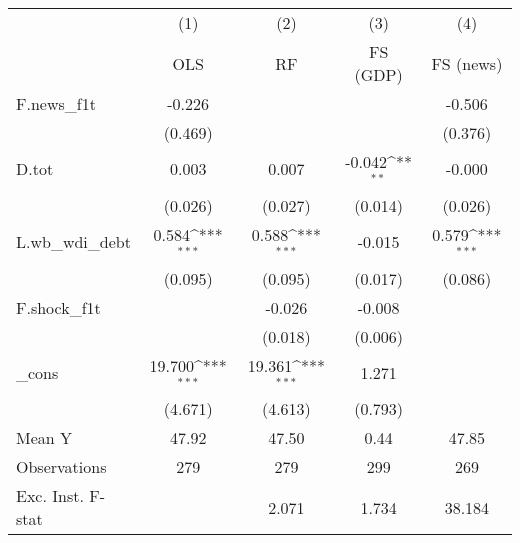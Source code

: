 {
\def\sym#1{\ifmmode^{#1}\else\(^{#1}\)\fi}
\begin{tabular}{l*{4}{c}}
\toprule
            &\multicolumn{1}{c}{(1)}&\multicolumn{1}{c}{(2)}&\multicolumn{1}{c}{(3)}&\multicolumn{1}{c}{(4)}\\
            &\multicolumn{1}{c}{OLS}&\multicolumn{1}{c}{RF}&\multicolumn{1}{c}{FS (GDP)}&\multicolumn{1}{c}{FS (news)}\\
\midrule
F.news\_f1t  &      -0.226         &                     &                     &      -0.506         \\
            &     (0.469)         &                     &                     &     (0.376)         \\
\addlinespace
D.tot       &       0.003         &       0.007         &      -0.042\sym{**} &      -0.000         \\
            &     (0.026)         &     (0.027)         &     (0.014)         &     (0.026)         \\
\addlinespace
L.wb\_wdi\_debt&       0.584\sym{***}&       0.588\sym{***}&      -0.015         &       0.579\sym{***}\\
            &     (0.095)         &     (0.095)         &     (0.017)         &     (0.086)         \\
\addlinespace
F.shock\_f1t &                     &      -0.026         &      -0.008         &                     \\
            &                     &     (0.018)         &     (0.006)         &                     \\
\addlinespace
\_cons      &      19.700\sym{***}&      19.361\sym{***}&       1.271         &                     \\
            &     (4.671)         &     (4.613)         &     (0.793)         &                     \\
\midrule
Mean Y      &       47.92         &       47.50         &        0.44         &       47.85         \\
Observations&         279         &         279         &         299         &         269         \\
Exc. Inst. F-stat&                     &       2.071         &       1.734         &      38.184         \\
\bottomrule
\end{tabular}
}
